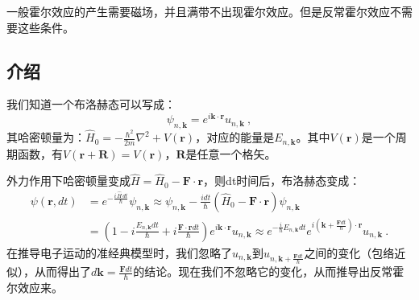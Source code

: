 \begin{issues}
\issueDraft
\end{issues}
一般霍尔效应的产生需要磁场，并且满带不出现霍尔效应。但是反常霍尔效应不需要这些条件。
\subsection{介绍}
我们知道一个布洛赫态可以写成：
\begin{equation}
\psi_{n,\boldsymbol{k}}=e^{i\boldsymbol{k}\cdot\boldsymbol{r}}u_{n,\boldsymbol{k}}~,
\end{equation}
其哈密顿量为：$\hat{H}_0=-\frac{\hbar^2}{2m}\nabla^2+V(\boldsymbol{r})$，对应的能量是$E_{n,\boldsymbol{k}}$。其中$V(\boldsymbol{r})$是一个周期函数，有$V(\boldsymbol{r}+\boldsymbol{R})=V(\boldsymbol{r})$，$\boldsymbol{R}$是任意一个格矢。

外力作用下哈密顿量变成$\hat{H}=\hat H_0 -\boldsymbol{F}\cdot\boldsymbol{r}$，则dt时间后，布洛赫态变成：
\begin{equation}
\begin{aligned}
\psi(\boldsymbol{r},dt)&=e^{-\frac{i\,\hat{H}\,dt}{\hbar}}\psi_{n,\boldsymbol{k}} \approx \psi_{n,\boldsymbol{k}}-\frac{idt}{\hbar}(\hat H_0 -\boldsymbol{F}\cdot\boldsymbol{r})\psi_{n,\boldsymbol{k}}\\
&=(1-i\frac{E_{n,\boldsymbol{k}}dt}{\hbar}+i\frac{\boldsymbol{F}\cdot\boldsymbol{r}dt}{\hbar})e^{i\boldsymbol{k}\cdot\boldsymbol{r}}u_{n,\boldsymbol{k}}
\approx e^{-\frac{i}{\hbar}E_{n,\boldsymbol{k}}dt}e^{i(\boldsymbol{k}+\frac{\boldsymbol{F}dt}{\hbar})\cdot \boldsymbol{r}}u_{n,\boldsymbol{k}}~.
\end{aligned}
\end{equation}
在推导电子运动的准经典模型时，我们忽略了$u_{n,\boldsymbol{k}}$到$u_{n,\boldsymbol{k}+\frac{\boldsymbol{F}dt}{\hbar}}$之间的变化（包络近似），从而得出了$d\boldsymbol{k}=\frac{\boldsymbol{F}dt}{\hbar}$的结论。现在我们不忽略它的变化，从而推导出反常霍尔效应来。

